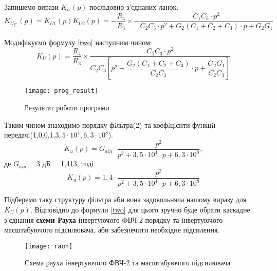 \documentclass[a4paper,14pt]{extreport}
\begin{document}
\begin{center}
\end{center}

Запишемо вирази $K_U(p)$ послідовно з'єднаних ланок:
	\begin{equation}\label{two}
	K_{U_{\sum}}(p)=K_{U1}(p)K_{U2}(p)=-\dfrac{R_4}{R_3}\times-\dfrac{C_1C_3\cdot p^2}{C_2C_3\cdot p^2+G_2(C_1+C_2+C_3)\cdot p+G_2G_1}
	\end{equation} 

	Модифікуємо формулу \eqref{two} наступним чином:
	\begin{equation}\label{eq}
	K_U(p)=\dfrac{R_4}{R_3}\times\dfrac{C_1C_3\cdot p^2}{C_2C_3\left[p^2+\dfrac{G_2(C_1+C_2+C_3)}{C_2C_3}\cdot p+\dfrac{G_2G_1}{C_2C_3}\right]}
	\end{equation}


\begin{center}
\end{center}

\begin{figure}[!h]\TopFloatBoxes\CenterFloatBoxes
	          {\texttt{[image: prog\_result]}}
	           \caption{Результат роботи програми}
\end{figure}


Таким чином знаходимо порядку фiльтра(2) та коефiцiєнти функцiї \\ передачi(1,0,0,1,$3,5\cdot 10^4, 6,3\cdot 10^8$). 
	$$ K_u(p) = G_{ain}\cdot \dfrac{p^2}{p^2+3,5\cdot 10^4\cdot p+6,3\cdot10^8}, $$
	де $G_{ain} = 3 $ дБ = 1,413, тоді
\begin{equation}\label{tre}
	 K_u(p) = 1,4\cdot \dfrac{p^2}{p^2+3,5\cdot 10^4\cdot p+6,3\cdot10^8}
\end{equation}
\newpage
\begin{center}
\end{center}

	Підберемо таку структуру фільтра аби вона задовольняла нашому виразу для $K_U(p)$. Відповідно до формули \eqref{two} для цього зручно буде обрати каскадне з'єднання {\bf схеми Рауха} інвертуючого ФВЧ-2 порядку та інвертуючого масштабуючого підсилювача, аби забезпечити необхідне підсилення.

	\begin{figure}[h]
	           {\texttt{[image: rauh]}}
	           \caption{Схема рауха інвертуючого ФВЧ-2 та масштабуючого підсилювача}
	\end{figure}
	

\begin{center}
\end{center}
	
\end{document}
